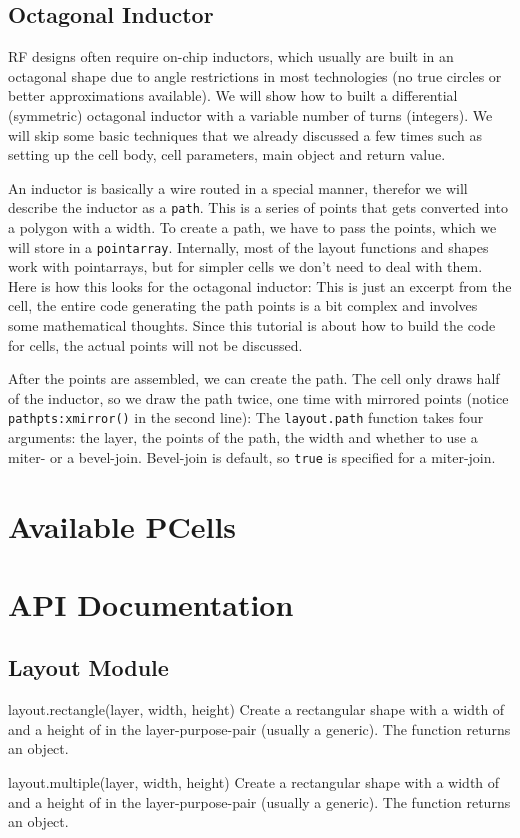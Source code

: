 \subsection{Octagonal Inductor}
RF designs often require on-chip inductors, which usually are built in an octagonal shape due to angle restrictions in most technologies (no true circles or better
approximations available). We will show how to built a differential (symmetric) octagonal inductor with a variable number of turns (integers). We will skip some
basic techniques that we already discussed a few times such as setting up the cell body, cell parameters, main object and return value.

An inductor is basically a wire routed in a special manner, therefor we will describe the inductor as a \lstinline!path!. This is a series of points that gets converted
into a polygon with a width. To create a path, we have to pass the points, which we will store in a \lstinline!pointarray!. Internally, most of the layout functions
and shapes work with pointarrays, but for simpler cells we don't need to deal with them. Here is how this looks for the octagonal inductor:
This is just an excerpt from the cell, the entire code generating the path points is a bit complex and involves some mathematical thoughts. Since this tutorial is
about how to build the code for cells, the actual points will not be discussed.

After the points are assembled, we can create the path. The cell only draws half of the inductor, so we draw the path twice, one time with mirrored points (notice
\lstinline!pathpts:xmirror()! in the second line):
The \lstinline!layout.path! function takes four arguments: the layer, the points of the path, the width and whether to use a miter- or a bevel-join. Bevel-join is
default, so \lstinline!true! is specified for a miter-join.

\section{Available PCells}
\section{API Documentation}
\subsection{Layout Module}
\begin{apifunc}{layout.rectangle(layer, width, height)} 
    Create a rectangular shape with a width of  and a height of  in the layer-purpose-pair  (usually a generic). The function
    returns an object.
\end{apifunc}
\begin{apifunc}{layout.multiple(layer, width, height)} 
    Create a rectangular shape with a width of  and a height of  in the layer-purpose-pair  (usually a generic). The function
    returns an object.
\end{apifunc}
